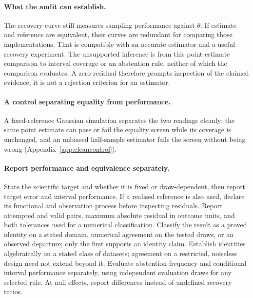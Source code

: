 \paragraph{What the audit can establish.}
The recovery curve still measures sampling performance against $\theta$.
If estimate and reference are equivalent, their curves are redundant for
comparing those implementations. That is compatible with an accurate estimator
and a useful recovery experiment. The unsupported inference is from this
point-estimate comparison to interval coverage or an abstention rule, neither
of which the comparison evaluates. A zero residual therefore prompts inspection
of the claimed evidence; it is not a rejection criterion for an estimator.

\paragraph{A control separating equality from performance.} A fixed-reference
Gaussian simulation separates the two readings cleanly: the same point
estimate can pass or fail the equality screen while its coverage is
unchanged, and an unbiased half-sample estimator fails the screen without
being wrong (Appendix~\ref{app:cleancontrol}).

\paragraph{Report performance and equivalence separately.}
State the scientific target and whether it is fixed or draw-dependent, then
report target error and interval performance. If a realised reference is also
used, declare its functional and observation process before inspecting
residuals. Report attempted and valid pairs, maximum absolute residual in outcome units,
and both tolerances used for a numerical classification. Classify the result
as a proved identity on a stated domain, numerical agreement on the tested
draws, or an observed departure; only the first supports an identity claim. Establish identities algebraically
on a stated class of datasets; agreement on a restricted, noiseless design need
not extend beyond it. Evaluate abstention frequency and conditional interval
performance separately, using independent evaluation draws for any selected
rule. At null effects, report differences instead of undefined recovery ratios.
